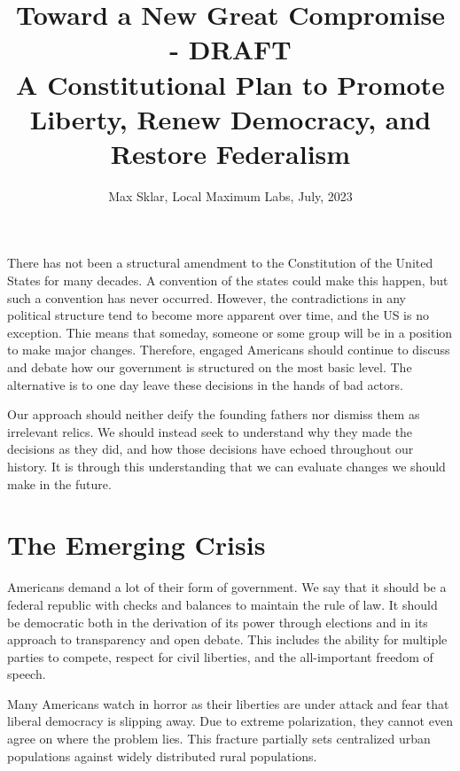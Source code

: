 \documentclass{article}
\begin{document}
\parindent=0in
\parskip=12pt

\title{
  Toward a New Great Compromise - DRAFT \\
  \large{
    A Constitutional Plan to Promote Liberty, Renew Democracy, and Restore Federalism
  }
}

\author{Max Sklar, Local Maximum Labs, July, 2023}
\date{}

\maketitle
\thispagestyle{empty}

There has not been a structural amendment to the Constitution of the United States for many decades. A convention of the states could make this happen, but such a convention has never occurred. However, the contradictions in any political structure tend to become more apparent over time, and the US is no exception. Thie means that someday, someone or some group will be in a position to make major changes. Therefore, engaged Americans should continue to discuss and debate how our government is structured on the most basic level. The alternative is to one day leave these decisions in the hands of bad actors.

Our approach should neither deify the founding fathers nor dismiss them as irrelevant relics. We should instead seek to understand why they made the decisions as they did, and how those decisions have echoed throughout our history. It is through this understanding that we can evaluate changes we should make in the future.

\section{The Emerging Crisis}

Americans demand a lot of their form of government. We say that it should be a federal republic with checks and balances to maintain the rule of law. It should be democratic both in the derivation of its power through elections and in its approach to transparency and open debate. This includes the ability for multiple parties to compete, respect for civil liberties, and the all-important freedom of speech.

Many Americans watch in horror as their liberties are under attack and fear that liberal democracy is slipping away. Due to extreme polarization, they cannot even agree on where the problem lies. This fracture partially sets centralized urban populations against widely distributed rural populations. 
\end{document}
